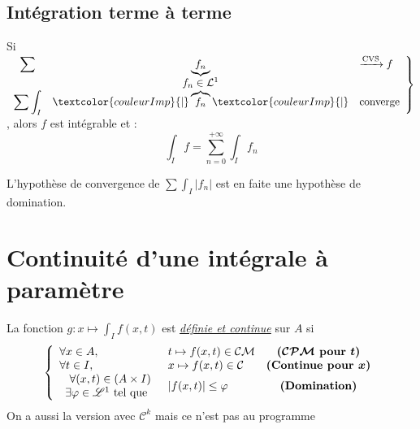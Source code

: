 \documentclass[11pt,a4paper,fleqn,pdftex]{report}
\begin{document}
\subsection{Intégration terme à terme} %
\label{sub:integration_terme_terme}
\begin{itheorem}
\label{thm:integration_terme_terme}
    Si $
        \displaystyle
        \left.
        \begin{array}{c c l}
        \displaystyle\sum & \underbrace{f_n} & \xrightarrow{\text{CVS}} f \\
                     & f_n \in \mathcal{L}^1 & \\
        \displaystyle\sum  \int_I \! \vphantom{\overbrace{f_n}} & \textcolor{couleurImp}{|}\overbrace{f_n}\textcolor{couleurImp}{|} & \text{converge}
        \end{array}
        \right\rbrace$, alors $f$ est intégrable et :
        \begin{equation}
        \int_I f = \sum_{n=0}^{+\infty} \int_I f_n
        \end{equation}
\end{itheorem}
 L'hypothèse de convergence de $\displaystyle\sum  \int_I |f_n|$ est en faite une hypothèse de domination.
\section{Continuité d'une intégrale à paramètre} %
\label{sec:continuite_d_une_integrale_parametre}
\begin{theorem}[Continuité]
La fonction $g : x \mapsto \int_I f(x,t)$ est \uline{\emph{définie et continue}} sur $A$ si 
\begin{equation}\left\lbrace
\begin{array}{l l c}
\forall x\in A,& t \mapsto f(x,t) \in \mathcal{CM}&\boldsymbol{( \mathcal{CPM} }\text{\textbf{ pour }}\boldsymbol{t)}\\
\forall t\in I,& x \mapsto f(x,t) \in \mathcal{C}&\text{\textbf{(Continue pour }}\boldsymbol{x)}\\
\begin{array}{r}
    \forall (x,t) \in (A\times I)\\
    \exists \varphi \in \mathscr{L}^{1}\text{ tel que } \\
\end{array}& |f(x,t)|\le \varphi&\text{\textbf{(Domination)}}\\
\end{array}
\right.
\end{equation}
On a aussi la version avec $\mathcal{C}^{k}$ mais ce n'est pas au programme
\end{theorem}
\end{document}
